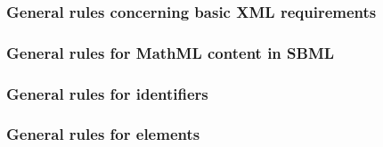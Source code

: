 \subsubsection*{General rules concerning basic XML requirements} \begin{sbmlenum}


\end{sbmlenum} \subsubsection*{General rules for MathML content in SBML} \begin{sbmlenum}



\end{sbmlenum} \subsubsection*{General rules for identifiers}  \begin{sbmlenum}


\end{sbmlenum} \subsubsection*{General rules for  elements} \begin{sbmlenum}



\end{sbmlenum}
